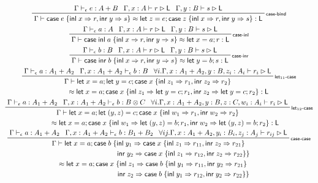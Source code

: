 \documentclass[acmsmall,screen,review]{acmart}
\newcommand{\ms}[1]{\ensuremath{\mathsf{#1}}}
\newcommand{\lto}{\Rightarrow}
\newcommand{\linl}[1]{\ms{inl}\;{#1}}
\newcommand{\linr}[1]{\ms{inr}\;{#1}}
\newcommand{\caseexpr}[5]{\ms{case}\;#1\;\{\linl{#2} \lto #3, \linr{#4} \lto #5\}}
\newcommand{\letstmt}[3]{\ensuremath{\ms{let}\;#1 = #2; #3}}
\newcommand{\casestmt}[5]{\ms{case}\;#1\;\{\linl{#2} \lto #3, \linr{#4} \lto #5\}}
\newcommand{\bhyp}[2]{#1 : #2}
\newcommand{\rle}[1]{{\scriptsize\textsf{#1}}}
\newcommand{\hasty}[4]{#1 \vdash_{#2} #3: {#4}}
\newcommand{\haslb}[3]{#1 \vdash #2 \rhd #3}
\newcommand{\teqv}{\approx}
\newcommand{\lbeq}[4]{#1 \vdash #2 \teqv #3 : {#4}}
\begin{document}
\begin{gather*}
  \prftree[r]{\rle{case-bind}}
    {\hasty{\Gamma}{\epsilon}{e}{A + B}}
    {\haslb{\Gamma, \bhyp{x}{A}}{r}{\ms{L}}}
    {\haslb{\Gamma, \bhyp{y}{B}}{s}{\ms{L}}}
    {\lbeq{\Gamma}{\caseexpr{e}{x}{r}{y}{s}}{\letstmt{z}{e}{\caseexpr{z}{x}{r}{y}{s}}}{\ms{L}}}
  \\
  \prftree[r]{\rle{case-inl}}
    {\hasty{\Gamma}{\epsilon}{a}{A}}
    {\haslb{\Gamma, \bhyp{x}{A}}{r}{\ms{L}}}
    {\haslb{\Gamma, \bhyp{y}{B}}{s}{\ms{L}}}
    {\lbeq{\Gamma}{\caseexpr{\linl{a}}{x}{r}{y}{s}}{\letstmt{x}{a}{r}}{\ms{L}}}
  \\
  \prftree[r]{\rle{case-inr}}
    {\hasty{\Gamma}{\epsilon}{b}{B}}
    {\haslb{\Gamma, \bhyp{x}{A}}{r}{\ms{L}}}
    {\haslb{\Gamma, \bhyp{y}{B}}{s}{\ms{L}}}
    {\lbeq{\Gamma}{\caseexpr{\linr{b}}{x}{r}{y}{s}}{\letstmt{y}{b}{s}}{\ms{L}}}
  \\
  \prftree[r]{\rle{let$_{11}$-case}}
    {\hasty{\Gamma}{\epsilon}{a}{A_1 + A_2}}
    {\hasty{\Gamma, \bhyp{x}{A_1 + A_2}}{\epsilon}{b}{B}}
    {
    \forall i. \haslb{\Gamma, \bhyp{x}{A_1 + A_2}, \bhyp{y}{B}, \bhyp{z_i}{A_i}}{r_i}{\ms{L}}
    }
    {
      \prfStackPremises
      {\Gamma \vdash \letstmt{x}{a}{\letstmt{y}{c}{\casestmt{x}{z_1}{r_1}{z_2}{r_2}}}}
      {\hspace{6em} \approx 
        \letstmt{x}{a}{\casestmt{x}{z_1}{\letstmt{y}{c}{r_1}}{z_2}{\letstmt{y}{c}{r_2}}} 
        : \ms{L}}
    }
  \\
  \prftree[r]{\rle{let$_{12}$-case}}
    {\hasty{\Gamma}{\epsilon}{a}{A_1 + A_2}}
    {\hasty{\Gamma, \bhyp{x}{A_1 + A_2}}{\epsilon}{b}{B \otimes C}}
    {
    \forall i. 
      \haslb{\Gamma, \bhyp{x}{A_1 + A_2}, \bhyp{y}{B}, \bhyp{z}{C}, \bhyp{w_i}{A_i}}{r_i}{\ms{L}}
    }
    {
      \prfStackPremises
      {\Gamma \vdash \letstmt{x}{a}{\letstmt{(y, z)}{c}{\casestmt{x}{w_1}{r_1}{w_2}{r_2}}}}
      {\hspace{5em} \approx 
        \letstmt{x}{a}{\casestmt{x}{w_1}{\letstmt{(y, z)}{b}{r_1}}{w_2}{\letstmt{(y, z)}{b}{r_2}}} 
        : \ms{L}}
    }
  \\
  \prftree[r]{\rle{case-case}}
    {\hasty{\Gamma}{\epsilon}{a}{A_1 + A_2}}
    {\hasty{\Gamma, \bhyp{x}{A_1 + A_2}}{\epsilon}{b}{B_1 + B_2}}
    {
    \forall i j. 
      \haslb{\Gamma, \bhyp{x}{A_1 + A_2}, \bhyp{y_i}{B_i}, \bhyp{z_j}{A_j}}{r_{ij}}{\ms{L}}
    }
    {
      \prfStackPremises
      {\Gamma \vdash \ms{let}\;x = a; \ms{case}\;b\;\{
        \linl{y_1} \Rightarrow \casestmt{x}{z_1}{r_{11}}{z_2}{r_{21}}
      }
      {
        \hspace{10em} \linr{y_2} \Rightarrow \casestmt{x}{z_1}{r_{12}}{z_2}{r_{22}}\}
      }
      {
        \hspace{1.3em} \approx \ms{let}\;x = a; \ms{case}\;x\;\{
        \linl{z_1} \Rightarrow \casestmt{b}{y_1}{r_{11}}{y_2}{r_{21}}
      }
      {
        \hspace{10em} \linr{z_2} \Rightarrow \casestmt{b}{y_1}{r_{12}}{y_2}{r_{22}}\}
      }
    }
\end{gather*}
\end{document}
